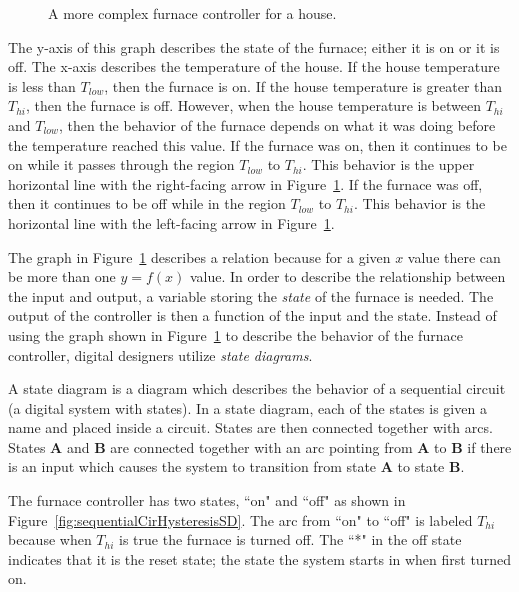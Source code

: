 \begin{figure}[ht]
\caption{A more complex furnace controller for a house.}
\label{fig:sequentialCirHysteresisGraph}
\end{figure}

The y-axis of this graph describes the state of the furnace; either it is 
on or it is off.  The x-axis describes the temperature of the house.  If the 
house temperature is less than $T_{low}$, then the furnace is on.  If the 
house temperature is greater than $T_{hi}$, then the furnace is off.  However, 
when the house temperature is between $T_{hi}$ and $T_{low}$, then the 
behavior of the furnace depends on what it was doing before the 
temperature reached this value.  If the furnace was on, then it continues
to be on while it passes through the region $T_{low}$ to $T_{hi}$. This behavior
is the upper horizontal line with the right-facing arrow in 
Figure~\ref{fig:sequentialCirHysteresisGraph}.  If the furnace was off, then it continues 
to be off while in the region $T_{low}$ to $T_{hi}$.  This behavior is the 
horizontal line with the left-facing arrow in Figure~\ref{fig:sequentialCirHysteresisGraph}.

The graph in Figure~\ref{fig:sequentialCirHysteresisGraph} describes a relation because 
for a given $x$ value there can be more than one $y=f(x)$ value.  In order to
describe the relationship between the input and output, a variable 
storing the \textit{ state} of the furnace is needed.  The output of the controller 
is then a function of the input and the state.  Instead of using the graph
shown in Figure~\ref{fig:sequentialCirHysteresisGraph} to describe the behavior of the
furnace controller, digital designers utilize \textit{ state diagrams}.

A state diagram is a diagram which describes the behavior of a sequential
circuit (a digital system with states).  In a state diagram, each of the
states is given a name and placed inside a circuit.  States are then 
connected together with arcs. States \textbf{ A} and \textbf{ B} are connected together 
with an arc pointing from \textbf{ A} to \textbf{ B} if there is an input which causes 
the system to transition from state \textbf{ A} to state \textbf{ B}.  

The furnace controller has two states, ``on" and ``off" as shown in
Figure~\ref{fig:sequentialCirHysteresisSD}.  The arc from ``on" to ``off" is labeled
$T_{hi}$ because when $T_{hi}$ is true the furnace is turned off.  
The ``*" in the off state indicates that it is the reset state; the 
state the system starts in when first turned on.

